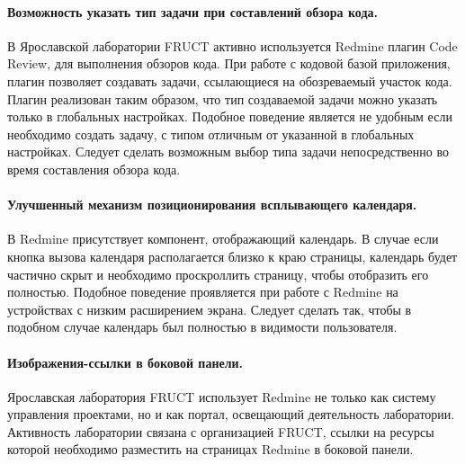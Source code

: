 \paragraph{Возможность указать тип задачи при составлений обзора кода.}
В Ярославской лаборатории FRUCT активно используется Redmine плагин Code
Review, для выполнения обзоров кода. При работе с кодовой базой приложения,
плагин позволяет создавать задачи, ссылающиеся на обозреваемый участок кода.
Плагин реализован таким образом, что тип создаваемой задачи можно указать
только в глобальных настройках. Подобное поведение является не удобным
если необходимо создать задачу, с типом отличным от указанной в глобальных
настройках. Следует сделать возможным выбор типа задачи непосредственно во
время составления обзора кода.


\paragraph{Улучшенный механизм позиционирования всплывающего календаря.}
В Redmine присутствует компонент, отображающий календарь. В случае если кнопка
вызова календаря располагается близко к краю страницы, календарь
будет частично скрыт и необходимо проскроллить страницу, чтобы отобразить его
полностью. Подобное поведение проявляется при работе с Redmine на устройствах с
низким расширением экрана. Следует сделать так, чтобы в подобном случае
календарь был полностью в видимости пользователя.

\paragraph{Изображения-ссылки в боковой панели.}
Ярославская лаборатория FRUCT использует Redmine не только как систему
управления проектами, но и как портал, освещающий деятельность лаборатории.
Активность лаборатории связана с организацией FRUCT, ссылки на ресурсы которой
необходимо разместить на страницах Redmine в боковой панели.


